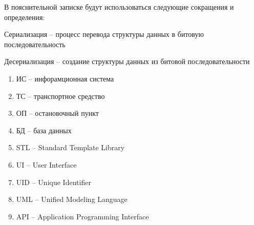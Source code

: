В пояснительной записке будут использоваться следующие сокращения и определения:
\begin{definition}
Сериализация -- процесс перевода структуры данных в битовую последовательность
\end{definition}
\begin{definition}
Десериализация -- создание структуры данных из битовой последовательности
\end{definition}
\begin{enumerate}
    \item ИС -- инфорамционная система
    \item ТС -- транспортное средство
    \item ОП -- остановочный пункт
    \item БД -- база данных
    \item STL -- Standard Template Library
    \item UI -- User Interface
    \item UID -- Unique Identifier
    \item UML -- Unified Modeling Language
    \item API -- Application Programming Interface
\end{enumerate}